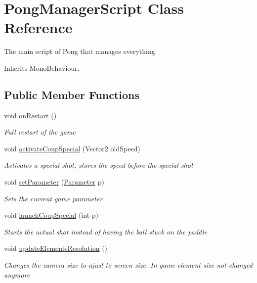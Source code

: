 \hypertarget{class_pong_manager_script}{\section{Pong\-Manager\-Script Class Reference}
\label{class_pong_manager_script}
}


The main script of Pong that manages everything  




Inherits Mono\-Behaviour.

\subsection*{Public Member Functions}
\begin{DoxyCompactItemize}
\item 
void \hyperlink{class_pong_manager_script_a796d6a8a65c1b47f89e0fd19141a4064}{on\-Restart} ()
\begin{DoxyCompactList}\small\item\em Full restart of the game \end{DoxyCompactList}\item 
void \hyperlink{class_pong_manager_script_a4b5b4644d603637563df3d69c9a158fc}{activate\-Coup\-Special} (Vector2 old\-Speed)
\begin{DoxyCompactList}\small\item\em Activates a special shot, stores the speed before the special shot \end{DoxyCompactList}\item 
void \hyperlink{class_pong_manager_script_a94ac020e95a8df42e50927ef08467197}{set\-Parameter} (\hyperlink{class_parameter}{Parameter} p)
\begin{DoxyCompactList}\small\item\em Sets the current game parameter \end{DoxyCompactList}\item 
void \hyperlink{class_pong_manager_script_a9d2a0621b5d133f7c2c9deb5aa1a6b20}{launch\-Coup\-Special} (int p)
\begin{DoxyCompactList}\small\item\em Starts the actual shot instead of having the ball stuck on the paddle \end{DoxyCompactList}\item 
void \hyperlink{class_pong_manager_script_a9998658fca22660c988d4acc459c7570}{update\-Elements\-Resolution} ()
\begin{DoxyCompactList}\small\item\em Changes the camera size to ajust to screen size. In game element size not changed anymore \end{DoxyCompactList}\end{DoxyCompactItemize}
